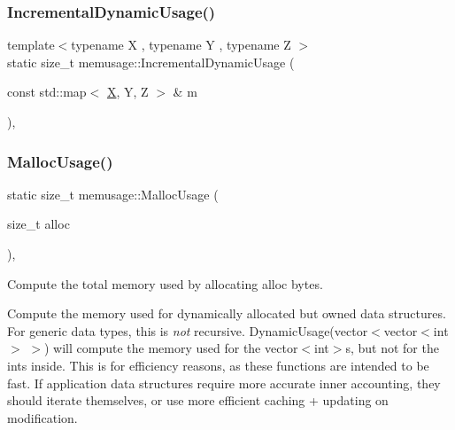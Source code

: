 \subsubsection{\texorpdfstring{Incremental\+Dynamic\+Usage()}{IncrementalDynamicUsage()}\hspace{0.1cm}{\footnotesize\ttfamily [2/2]}}
{\footnotesize\ttfamily template$<$typename X , typename Y , typename Z $>$ \\
static size\+\_\+t memusage\+::\+Incremental\+Dynamic\+Usage (\begin{DoxyParamCaption}\item[{const std\+::map$<$ \mbox{\hyperlink{net_8cpp_a826edd40636cbaa44266b97c8c6a4fa3}{X}}, Y, Z $>$ \&}]{m }\end{DoxyParamCaption})\hspace{0.3cm}{\ttfamily [inline]}, {\ttfamily [static]}}

\mbox{\label{namespacememusage_ae8ade104f83bf4c608c282adc365bf90}} 
\subsubsection{\texorpdfstring{Malloc\+Usage()}{MallocUsage()}}
{\footnotesize\ttfamily static size\+\_\+t memusage\+::\+Malloc\+Usage (\begin{DoxyParamCaption}\item[{size\+\_\+t}]{alloc }\end{DoxyParamCaption})\hspace{0.3cm}{\ttfamily [inline]}, {\ttfamily [static]}}

Compute the total memory used by allocating alloc bytes.

Compute the memory used for dynamically allocated but owned data structures. For generic data types, this is {\itshape not} recursive. Dynamic\+Usage(vector$<$vector$<$int$>$ $>$) will compute the memory used for the vector$<$int$>$\textquotesingle{}s, but not for the ints inside. This is for efficiency reasons, as these functions are intended to be fast. If application data structures require more accurate inner accounting, they should iterate themselves, or use more efficient caching + updating on modification. 